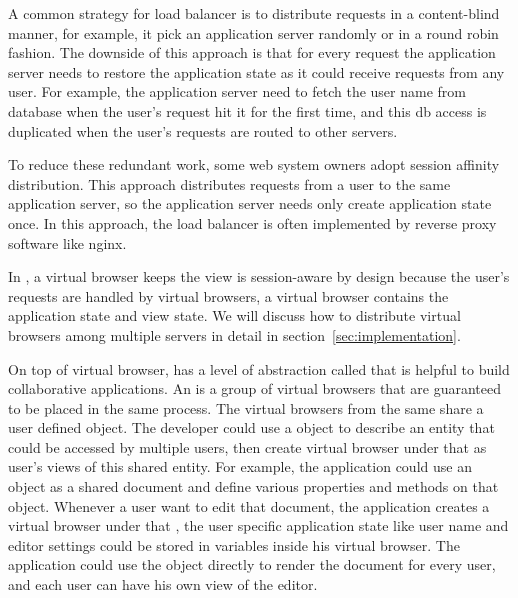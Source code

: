 A common strategy for load balancer is to distribute requests in a content-blind manner,
for example, it pick an application server randomly or in a round robin fashion.
The downside of this approach is that 
for every request the application server needs to restore the application state
as it could receive requests from any user.
For example, the application server need to 
fetch the user name from database when the user's request hit it for the first time,
and this db access is duplicated when the user's requests 
are routed to other servers.

To reduce these redundant work, some web system owners adopt
session affinity distribution.
This approach distributes requests from a user to the same application server,
so the application server needs only create application state once.
In this approach, the load balancer is often implemented by reverse proxy software
like nginx.


In \cb{}, a virtual browser keeps the view 
\cb{} is session-aware by design because 
the user's requests are handled by virtual browsers,
a virtual browser contains the application state and view state.
We will discuss how to distribute virtual browsers among multiple servers
 in detail in section~\ref{sec:implementation}.

On top of virtual browser, 
\cb{} has a level of abstraction called \appins{} that is helpful
to build collaborative applications.
An \appins{} is a group of virtual browsers that are guaranteed to be placed
in the same \cb{} process.
The virtual browsers from the same \appins{} share a user defined \appins{} object.
The developer could use a \appins{} object to describe an entity that 
could be accessed by multiple users, 
then create virtual browser under that \appins{} as user's views of this shared entity.
For example, the application could use an \appins{} object as a shared document and 
define various properties and methods on that object.
Whenever a user want to edit that document, the application
creates a virtual browser under that \appins{},
the user specific application state like user name and editor settings 
could be stored in variables inside his virtual browser.
The application could use the \appins{} object directly to render the document for every user, 
and each user can have his own view of the editor.

